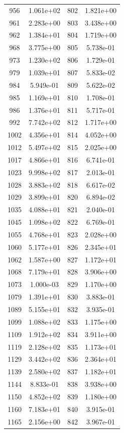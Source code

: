 \documentclass[12pt]{article}
\begin{document}
\begin{longtable}{@{}cccc@{}}
956 & 1.061e+02 & 802 & 1.821e+00 \\
961 & 2.283e+00 & 803 & 3.438e+00 \\
962 & 1.384e+01 & 804 & 1.719e+00 \\
968 & 3.775e+00 & 805 & 5.738e-01 \\
973 & 1.230e+02 & 806 & 1.729e-01 \\
979 & 1.039e+01 & 807 & 5.833e-02 \\
984 & 5.949e-01 & 809 & 5.622e-02 \\
985 & 1.169e+01 & 810 & 1.708e-01 \\
986 & 1.376e+01 & 811 & 5.717e-01 \\
992 & 7.742e+02 & 812 & 1.717e+00 \\
1002 & 4.356e+01 & 814 & 4.052e+00 \\
1012 & 5.497e+02 & 815 & 2.025e+00 \\
1017 & 4.866e+01 & 816 & 6.741e-01 \\
1023 & 9.998e+02 & 817 & 2.013e-01 \\
1028 & 3.883e+02 & 818 & 6.617e-02 \\
1029 & 3.899e+01 & 820 & 6.894e-02 \\
1035 & 4.088e+01 & 821 & 2.040e-01 \\
1045 & 1.098e+02 & 822 & 6.769e-01 \\
1055 & 4.768e+01 & 823 & 2.028e+00 \\
1060 & 5.177e+01 & 826 & 2.345e+01 \\
1062 & 1.587e+00 & 827 & 1.172e+01 \\
1068 & 7.179e+01 & 828 & 3.906e+00 \\
1073 & 1.000e-03 & 829 & 1.170e+00 \\
1079 & 1.391e+01 & 830 & 3.883e-01 \\
1089 & 5.155e+01 & 832 & 3.935e-01 \\
1099 & 1.088e+02 & 833 & 1.175e+00 \\
1109 & 1.912e+02 & 834 & 3.911e+00 \\
1119 & 2.128e+02 & 835 & 1.173e+01 \\
1129 & 3.442e+02 & 836 & 2.364e+01 \\
1139 & 2.580e+02 & 837 & 1.182e+01 \\
1144 & 8.833e-01 & 838 & 3.938e+00 \\
1150 & 4.852e+02 & 839 & 1.180e+00 \\
1160 & 7.183e+01 & 840 & 3.915e-01 \\
1165 & 2.156e+00 & 842 & 3.967e-01 \\

\end{longtable}
\end{document}
